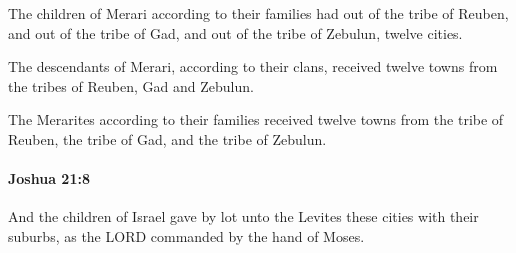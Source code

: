 			\begin{versebox}
					\item[BHS] 
					\item[ASV] The children of Merari according to their families had out of the tribe of Reuben, and out of the tribe of Gad, and out of the tribe of Zebulun, twelve cities.
					\item[NIV] The descendants of Merari, according to their clans, received twelve towns from the tribes of Reuben, Gad and Zebulun.
					\item[NRSV] The Merarites according to their families received twelve towns from the tribe of Reuben, the tribe of Gad, and the tribe of Zebulun.
			\end{versebox}

		\paragraph{Joshua 21:8} %
			\label{JOSHUA-21-8}

			And the children of Israel gave by lot unto the Levites these cities with their suburbs, as the LORD commanded by the hand of Moses.

